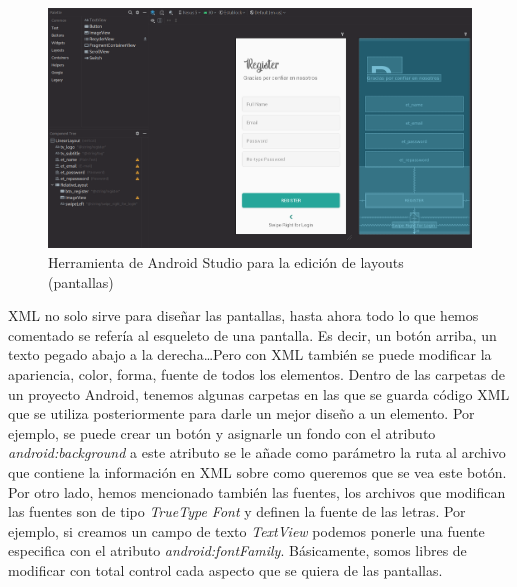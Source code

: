 \begin{figure}[h!]
  \centering
  \includegraphics[width=1\linewidth]{figs/Desarrollo/XML/androidStudio}
  \caption[XML Herramienta Android Studio]{Herramienta de Android Studio para la edición de layouts (pantallas)}
  \label{fig:herramienta_android}
\end{figure}

XML no solo sirve para diseñar las pantallas, hasta ahora todo lo que hemos comentado se refería al esqueleto de una pantalla. Es decir, un botón arriba, un texto pegado abajo a la derecha\dots Pero con XML también se puede modificar la apariencia, color, forma, fuente de todos los elementos. Dentro de las carpetas de un proyecto Android, tenemos algunas carpetas en las que se guarda código XML que se utiliza posteriormente para darle un mejor diseño a un elemento. Por ejemplo, se puede crear un botón y asignarle un fondo con el atributo \textit{android:background} a este atributo se le añade como parámetro la ruta al archivo que contiene la información en XML sobre como queremos que se vea este botón. Por otro lado, hemos mencionado también las fuentes, los archivos que modifican las fuentes son de tipo \emph{TrueType Font} y definen la fuente de las letras. Por ejemplo, si creamos un campo de texto \textit{TextView} podemos ponerle una fuente especifica con el atributo \textit{android:fontFamily}. Básicamente, somos libres de modificar con total control cada aspecto que se quiera de las pantallas. \\

